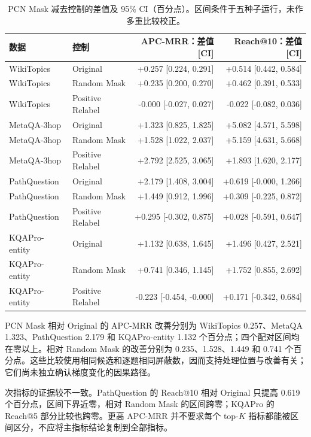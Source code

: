 \documentclass[UTF8,a4paper,10pt,fontset=fandol]{ctexart}
\begin{document}
\begin{table}[tbp]\centering
\caption{PCN Mask 减去控制的差值及 95\% CI（百分点）。区间条件于五种子运行，未作多重比较校正。}\label{tab:delta}
\small
\begin{tabular}{llrr}
\toprule
数据 & 控制 & APC-MRR：差值 [CI] & Reach@10：差值 [CI] \\
\midrule
WikiTopics & Original & +0.257 [0.224, 0.291] & +0.514 [0.442, 0.584] \\
WikiTopics & Random Mask & +0.235 [0.200, 0.270] & +0.462 [0.391, 0.533] \\
WikiTopics & Positive Relabel & -0.000 [-0.027, 0.027] & -0.022 [-0.082, 0.036] \\
MetaQA-3hop & Original & +1.323 [0.825, 1.825] & +5.082 [4.571, 5.598] \\
MetaQA-3hop & Random Mask & +1.528 [1.022, 2.037] & +5.159 [4.631, 5.668] \\
MetaQA-3hop & Positive Relabel & +2.792 [2.525, 3.065] & +1.893 [1.620, 2.177] \\
PathQuestion & Original & +2.179 [1.408, 3.004] & +0.619 [-0.000, 1.266] \\
PathQuestion & Random Mask & +1.449 [0.912, 1.996] & +0.309 [-0.225, 0.872] \\
PathQuestion & Positive Relabel & +0.295 [-0.302, 0.875] & +0.028 [-0.591, 0.647] \\
KQAPro-entity & Original & +1.132 [0.638, 1.645] & +1.496 [0.427, 2.521] \\
KQAPro-entity & Random Mask & +0.741 [0.346, 1.145] & +1.752 [0.855, 2.692] \\
KQAPro-entity & Positive Relabel & -0.223 [-0.454, -0.000] & +0.171 [-0.342, 0.684] \\
\bottomrule
\end{tabular}
\end{table}

PCN Mask 相对 Original 的 APC-MRR 改善分别为 WikiTopics 0.257、MetaQA 1.323、PathQuestion 2.179 和 KQAPro-entity 1.132 个百分点；四个配对区间均在零以上。相对 Random Mask 的改善分别为 0.235、1.528、1.449 和 0.741 个百分点。这些比较使用相同候选和逐题相同屏蔽数，因而支持处理位置与改善有关；它们尚未独立确认梯度变化的因果路径。

次指标的证据较不一致。PathQuestion 的 Reach@10 相对 Original 只提高 0.619 个百分点，区间下界近零，相对 Random Mask 的区间跨零；KQAPro 的 Reach@5 部分比较也跨零。更高 APC-MRR 并不要求每个 top-$K$ 指标都能被区间区分，不应将主指标结论复制到全部指标。
\end{document}
